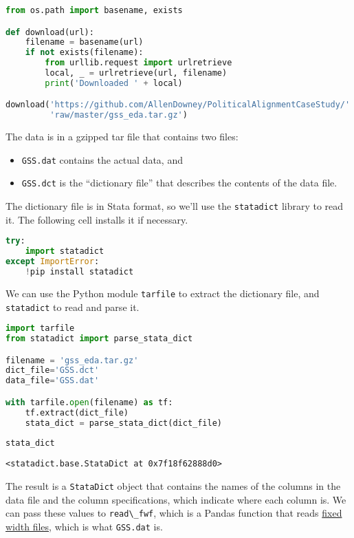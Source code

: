 \begin{lstlisting}[language=Python,style=source]
from os.path import basename, exists

def download(url):
    filename = basename(url)
    if not exists(filename):
        from urllib.request import urlretrieve
        local, _ = urlretrieve(url, filename)
        print('Downloaded ' + local)

download('https://github.com/AllenDowney/PoliticalAlignmentCaseStudy/' +
         'raw/master/gss_eda.tar.gz')
\end{lstlisting}

The data is in a gzipped tar file that contains two files:

\begin{itemize}
\item
  \passthrough{\lstinline!GSS.dat!} contains the actual data, and
\item
  \passthrough{\lstinline!GSS.dct!} is the ``dictionary file'' that
  describes the contents of the data file.
\end{itemize}

The dictionary file is in Stata format, so we'll use the
\passthrough{\lstinline!statadict!} library to read it. The following
cell installs it if necessary.

\begin{lstlisting}[language=Python,style=source]
try:
    import statadict
except ImportError:
    !pip install statadict
\end{lstlisting}

We can use the Python module \passthrough{\lstinline!tarfile!} to
extract the dictionary file, and \passthrough{\lstinline!statadict!} to
read and parse it.

\begin{lstlisting}[language=Python,style=source]
import tarfile
from statadict import parse_stata_dict

filename = 'gss_eda.tar.gz'
dict_file='GSS.dct'
data_file='GSS.dat'

with tarfile.open(filename) as tf:
    tf.extract(dict_file)
    stata_dict = parse_stata_dict(dict_file)
        
stata_dict
\end{lstlisting}

\begin{lstlisting}[style=output]
<statadict.base.StataDict at 0x7f18f62888d0>
\end{lstlisting}

The result is a \passthrough{\lstinline!StataDict!} object that contains
the names of the columns in the data file and the column specifications,
which indicate where each column is. We can pass these values to
\passthrough{\lstinline!read\_fwf!}, which is a Pandas function that
reads \href{https://en.wikipedia.org/wiki/Flat-file_database}{fixed
width files}, which is what \passthrough{\lstinline!GSS.dat!} is.

